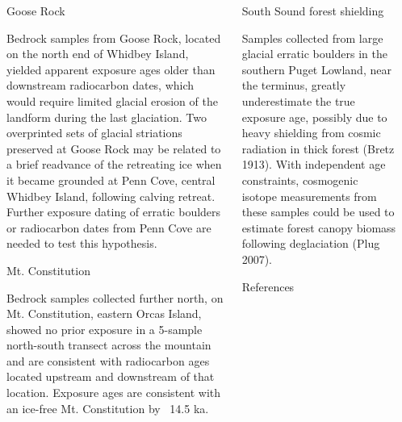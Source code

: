 \documentclass{beamer}
\begin{document}
\begin{frame}{}
\begin{columns}[T]
\begin{column}{0.32\columnwidth}
\end{column}
	
\begin{column}{.32\columnwidth}
	
\begin{block}{Goose Rock}

Bedrock samples from Goose  Rock, located on the north end of Whidbey Island, yielded apparent exposure ages older than downstream radiocarbon dates, which would require limited glacial erosion of the landform during the last glaciation.
Two overprinted sets of glacial striations preserved at Goose Rock may be related to a brief readvance of the retreating ice when it became grounded at Penn Cove, central Whidbey Island, following calving retreat.
Further exposure dating of erratic boulders or radiocarbon dates from Penn Cove are needed to test this hypothesis. 
	
\end{block}
	
\begin{block}{Mt. Constitution}
	
Bedrock samples collected further north, on Mt. Constitution, eastern Orcas Island, showed no prior exposure in a 5-sample north-south transect across the mountain and are consistent with radiocarbon ages located upstream and downstream of that location.
Exposure ages are consistent with an ice-free Mt. Constitution by ~14.5 ka. 

\end{block}

\end{column}

\begin{column}{.32\columnwidth}

\begin{block}{South Sound forest shielding}

Samples collected from large glacial erratic boulders in the southern Puget Lowland, near the terminus, greatly underestimate the true exposure age, possibly due to heavy shielding from cosmic radiation in thick forest (Bretz 1913).
With independent age constraints, cosmogenic isotope measurements from these samples could be used to estimate forest canopy biomass following deglaciation (Plug 2007).

\end{block}

\begin{block}{References} 
{\small

\begin{itemize}


\end{itemize}}
\end{block}
\end{column}
\end{columns}
\end{frame}
\end{document}
